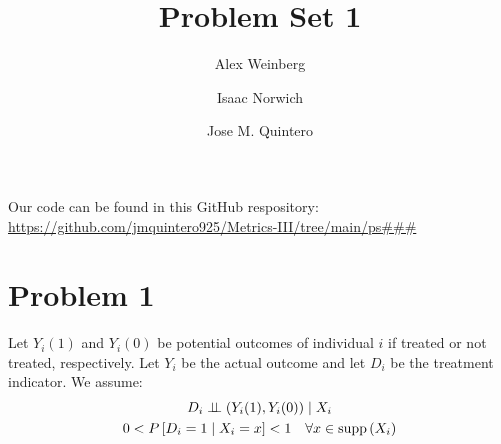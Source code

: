 \documentclass{article}
\title{Problem Set 1}
\author{Alex Weinberg \and Isaac Norwich \and Jose M. Quintero}
\begin{document}
\maketitle

Our code can be found in this GitHub respository: \url{https://github.com/jmquintero925/Metrics-III/tree/main/ps###}


\section*{Problem 1}
Let $Y_{i}(1)$ and $Y_{i}(0)$ be potential outcomes of individual $i$ if treated or not treated, respectively. Let $Y_{i}$ be the actual outcome and let $D_{i}$ be the treatment indicator. We assume:
\begin{align*}
\begin{gathered}
D_{i} \perp\!\!\!\perp \left(Y_{i}(1), Y_{i}(0)\right) \mid X_{i} \\
0<P\left[D_{i}=1 \mid X_{i}=x\right]<1 \quad \forall x \in \operatorname{supp}\left(X_{i}\right)
\end{gathered}
\end{align*}
\end{document}
